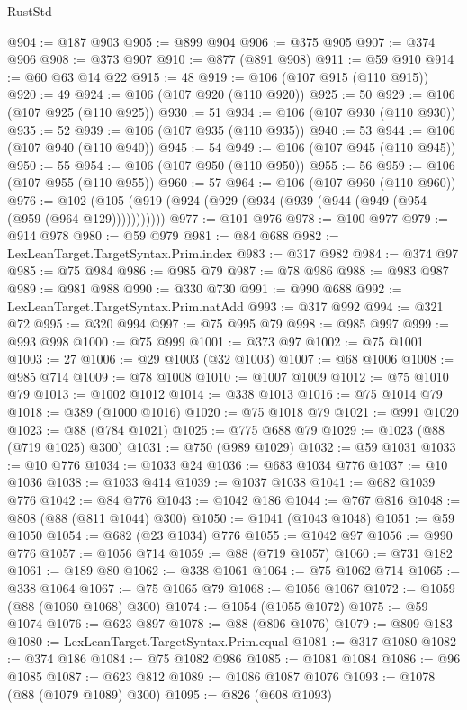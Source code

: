 \begin{lexlean}{RustStd}
\begin{coremodule}
@904 := @187 @903
@905 := @899 @904
@906 := @375 @905
@907 := @374 @906
@908 := @373 @907
@910 := @877 (@891 @908)
@911 := @59 @910
@914 := @60 @63 @14 @22
@915 := 48
@919 := @106 (@107 @915 (@110 @915))
@920 := 49
@924 := @106 (@107 @920 (@110 @920))
@925 := 50
@929 := @106 (@107 @925 (@110 @925))
@930 := 51
@934 := @106 (@107 @930 (@110 @930))
@935 := 52
@939 := @106 (@107 @935 (@110 @935))
@940 := 53
@944 := @106 (@107 @940 (@110 @940))
@945 := 54
@949 := @106 (@107 @945 (@110 @945))
@950 := 55
@954 := @106 (@107 @950 (@110 @950))
@955 := 56
@959 := @106 (@107 @955 (@110 @955))
@960 := 57
@964 := @106 (@107 @960 (@110 @960))
@976 := @102 (@105 (@919 (@924 (@929 (@934 (@939 (@944 (@949 (@954 (@959 (@964 @129)))))))))))
@977 := @101 @976
@978 := @100 @977
@979 := @914 @978
@980 := @59 @979
@981 := @84 @688
@982 := LexLeanTarget.TargetSyntax.Prim.index
@983 := @317 @982
@984 := @374 @97
@985 := @75 @984
@986 := @985 @79
@987 := @78 @986
@988 := @983 @987
@989 := @981 @988
@990 := @330 @730
@991 := @990 @688
@992 := LexLeanTarget.TargetSyntax.Prim.natAdd
@993 := @317 @992
@994 := @321 @72
@995 := @320 @994
@997 := @75 @995 @79
@998 := @985 @997
@999 := @993 @998
@1000 := @75 @999
@1001 := @373 @97
@1002 := @75 @1001
@1003 := 27
@1006 := @29 @1003 (@32 @1003)
@1007 := @68 @1006
@1008 := @985 @714
@1009 := @78 @1008
@1010 := @1007 @1009
@1012 := @75 @1010 @79
@1013 := @1002 @1012
@1014 := @338 @1013
@1016 := @75 @1014 @79
@1018 := @389 (@1000 @1016)
@1020 := @75 @1018 @79
@1021 := @991 @1020
@1023 := @88 (@784 @1021)
@1025 := @775 @688 @79
@1029 := @1023 (@88 (@719 @1025) @300)
@1031 := @750 (@989 @1029)
@1032 := @59 @1031
@1033 := @10 @776
@1034 := @1033 @24
@1036 := @683 @1034 @776
@1037 := @10 @1036
@1038 := @1033 @414
@1039 := @1037 @1038
@1041 := @682 @1039 @776
@1042 := @84 @776
@1043 := @1042 @186
@1044 := @767 @816
@1048 := @808 (@88 (@811 @1044) @300)
@1050 := @1041 (@1043 @1048)
@1051 := @59 @1050
@1054 := @682 (@23 @1034) @776
@1055 := @1042 @97
@1056 := @990 @776
@1057 := @1056 @714
@1059 := @88 (@719 @1057)
@1060 := @731 @182
@1061 := @189 @80
@1062 := @338 @1061
@1064 := @75 @1062 @714
@1065 := @338 @1064
@1067 := @75 @1065 @79
@1068 := @1056 @1067
@1072 := @1059 (@88 (@1060 @1068) @300)
@1074 := @1054 (@1055 @1072)
@1075 := @59 @1074
@1076 := @623 @897
@1078 := @88 (@806 @1076)
@1079 := @809 @183
@1080 := LexLeanTarget.TargetSyntax.Prim.equal
@1081 := @317 @1080
@1082 := @374 @186
@1084 := @75 @1082 @986
@1085 := @1081 @1084
@1086 := @96 @1085
@1087 := @623 @812
@1089 := @1086 @1087 @1076
@1093 := @1078 (@88 (@1079 @1089) @300)
@1095 := @826 (@608 @1093)

\end{coremodule}
\end{lexlean}
